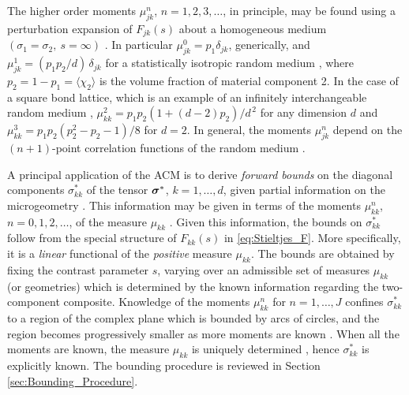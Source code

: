 \documentclass{cmslatex}
\newcommand\bsig{\mbox{\boldmath${\sigma}$}}
\begin{document}
The higher order moments $\mu_{jk}^n$, $n=1,2,3,\ldots$, in principle, may be
found using a perturbation expansion of $F_{jk}(s)$ about a
homogeneous medium $(\sigma_1=\sigma_2, \ s=\infty)$ \cite{Golden:CMP-473}. In
particular $\mu_{jk}^0=p_1\delta_{jk}$, generically, and $\mu_{jk}^1=(p_1p_2/d)\,\delta_{jk}$
for a statistically isotropic random medium 
\cite{Golden:CMP-473,Golden:IMA-97,Bruno:JSP-365}, where
$p_2=1-p_1=\langle\chi_2\rangle$ is the volume fraction of material component 2. In
the case of a square bond lattice, which is an example of an
infinitely interchangeable random medium \cite{Bruno:JSP-365},
$\mu_{kk}^2=p_1p_2(1+(d-2)p_2)/d^{\,2}$ for any dimension $d$ and
$\mu_{kk}^3=p_1p_2(p_2^2-p_2-1)/8$ for $d=2$. In general, the moments
$\mu_{jk}^n$ depend on the $(n+1)$-point correlation functions of the
random medium \cite{Golden:CMP-473,Bruno:JSP-365}.




A principal application of the ACM is to derive \emph{forward bounds}
on the diagonal components $\sigma_{kk}^*$ of the tensor $\bsig^*$,
$k=1,\ldots,d$, given partial information on the microgeometry
\cite{Bergman:PRL-1285,Milton:APL-300,Golden:CMP-473,Bergman:AP-78}. This
information may be given in terms of the moments $\mu_{kk}^n$,
$n=0,1,2,\ldots$, of the measure $\mu_{kk}$
\cite{Milton:JAP-5294,Golden:CMP-473}. Given this information, the 
bounds on $\sigma_{kk}^*$ follow from the special structure of $F_{kk}(s)$
in \eqref{eq:Stieltjes_F}. More specifically, it is a \emph{linear}
functional of the \emph{positive} measure $\mu_{kk}$.  The bounds are
obtained by fixing the contrast parameter $s$, varying over an
admissible set of measures $\mu_{kk}$ (or geometries) which is
determined by the known information regarding the two-component
composite.  Knowledge of the moments $\mu_{kk}^n$  for $n=1,\ldots,J$ confines
$\sigma_{kk}^*$ to a region of the complex plane which is bounded by arcs
of circles, and the region becomes progressively smaller as more
moments are known \cite{Milton:JAP-5294,Golden:JMPS-333}. When 
all the moments are known, the measure $\mu_{kk}$ is uniquely determined 
\cite{Akhiezer:Book:1965}, hence  $\sigma_{kk}^*$ is explicitly known. The
bounding procedure is reviewed in Section
\ref{sec:Bounding_Procedure}.
\end{document}
